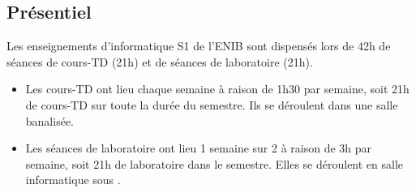 \subsection{Présentiel}
Les enseignements d'informatique S1 de l'ENIB sont dispensés lors de 42h
de séances de cours-TD (21h) et de séances de laboratoire (21h).
\begin{itemize}
\item Les cours-TD ont lieu chaque semaine à raison de 1h30 par semaine, soit
21h de cours-TD sur toute la durée du semestre. Ils se déroulent dans une salle
banalisée.
\item Les séances de laboratoire ont lieu 1 semaine sur 2 
à raison de 3h par semaine, soit 21h de laboratoire dans le semestre. Elles
se déroulent en salle informatique sous \linux.
\end{itemize}



